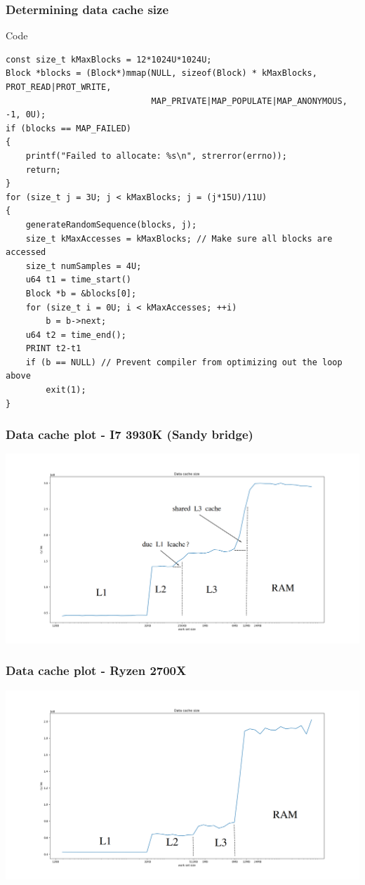 \documentclass{beamer}
\begin{document}
\begin{frame}[fragile]
\frametitle{Determining data cache size}
\begin{block}{Code}
\begin{lstlisting}[style=code]
const size_t kMaxBlocks = 12*1024U*1024U;
Block *blocks = (Block*)mmap(NULL, sizeof(Block) * kMaxBlocks, PROT_READ|PROT_WRITE,
                             MAP_PRIVATE|MAP_POPULATE|MAP_ANONYMOUS, -1, 0U);
if (blocks == MAP_FAILED)
{
    printf("Failed to allocate: %s\n", strerror(errno));
    return;
}
for (size_t j = 3U; j < kMaxBlocks; j = (j*15U)/11U)
{
    generateRandomSequence(blocks, j);
    size_t kMaxAccesses = kMaxBlocks; // Make sure all blocks are accessed
    size_t numSamples = 4U; 
    u64 t1 = time_start()
    Block *b = &blocks[0]; 
    for (size_t i = 0U; i < kMaxAccesses; ++i)
        b = b->next;
    u64 t2 = time_end();
    PRINT t2-t1
    if (b == NULL) // Prevent compiler from optimizing out the loop above
        exit(1);
}

\end{lstlisting}
\end{block}
\end{frame}

\begin{frame}
\frametitle{Data cache plot - I7 3930K (Sandy bridge)}
\includegraphics[scale=.18]{img/data_size.png}
\end{frame}

\begin{frame}
\frametitle{Data cache plot - Ryzen 2700X}
\includegraphics[scale=.18]{img/data_size_zen.png}
\end{frame}
\end{document}
